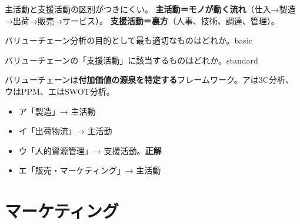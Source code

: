 \mondaipage
{}

\begin{stumble}
主活動と支援活動の区別がつきにくい。
\textbf{主活動＝モノが動く流れ}（仕入→製造→出荷→販売→サービス）。
\textbf{支援活動＝裏方}（人事、技術、調達、管理）。
\end{stumble}


\begin{mondai}{バリューチェーン分析の目的として最も適切なものはどれか。}{basic}
\end{mondai}

\begin{mondai}{バリューチェーンの「支援活動」に該当するものはどれか。}{standard}
\end{mondai}

\kaitoupage

\begin{kaisetsu}
バリューチェーンは\textbf{付加価値の源泉を特定する}フレームワーク。アは3C分析、ウはPPM、エはSWOT分析。
\end{kaisetsu}

\begin{goutoubun}
\begin{itemize}
  \item ア「製造」→ 主活動
  \item イ「出荷物流」→ 主活動
  \item ウ「人的資源管理」→ 支援活動。\textbf{正解}
  \item エ「販売・マーケティング」→ 主活動
\end{itemize}
\end{goutoubun}


\section{マーケティング}

